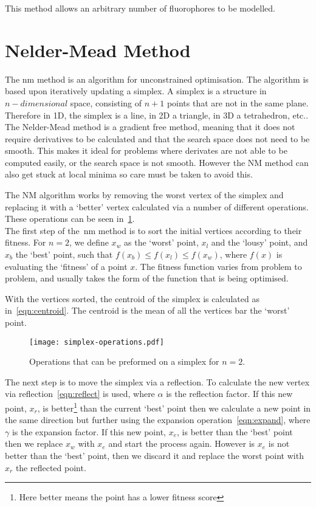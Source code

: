 This method allows an arbitrary number of fluorophores to be modelled.


\section{Nelder-Mead Method}

The \gls*{nm} method is an algorithm for unconstrained optimisation. 
The algorithm is based upon iteratively updating a simplex. 
A simplex is a structure in $n-dimensional$ space, consisting of $n+1$ points that are not in the same plane. 
Therefore in 1D, the simplex is a line, in 2D a triangle, in 3D a tetrahedron, etc.. 
The Nelder-Mead method is a gradient free method, meaning that it does not require derivatives to be calculated and that the search space does not need to be smooth.
This makes it ideal for problems where derivates are not able to be computed easily, or the search space is not smooth.
However the NM method can also get stuck at local minima so care must be taken to avoid this.

The NM algorithm works by removing the worst vertex of the simplex and replacing it with a `better' vertex calculated via a number of different operations.
These operations can be seen in~\cref{fig:NM-operations}.\\

The first step of the~\gls*{nm} method is to sort the initial vertices according to their fitness.
For $n=2$, we define $x_w$ as the `worst' point, $x_l$ and the `lousy' point, and $x_b$ the `best' point, such that $f(x_b)\leq f(x_l)\leq f(x_w)$, where $f(x)$ is evaluating the `fitness' of a point $x$. 
The fitness function varies from problem to problem, and usually takes the form of the function that is being optimised.

With the vertices sorted, the centroid of the simplex is calculated as in~\cref{eqn:centroid}.
The centroid is the mean of all the vertices bar the `worst' point.

\begin{figure}[!htbp]
    \centering
    \texttt{[image: simplex-operations.pdf]}
    \caption{Operations that can be preformed on a simplex for $n=2$.}
    \label{fig:NM-operations}
\end{figure}

The next step is to move the simplex via a reflection.
To calculate the new vertex via reflection~\cref{eqn:reflect} is used, where $\alpha$ is the reflection factor.
If this new point, $x_r$, is better\footnote{Here better means the point has a lower fitness score} than the current `best' point then we calculate a new point in the same direction but further using the expansion operation~\cref{eqn:expand}, where $\gamma$ is the expansion factor.
If this new point, $x_e$, is better than the `best' point then we replace $x_w$ with $x_e$ and start the process again.
However is $x_e$ is not better than the `best' point, then we discard it and replace the worst point with $x_r$ the reflected point.

